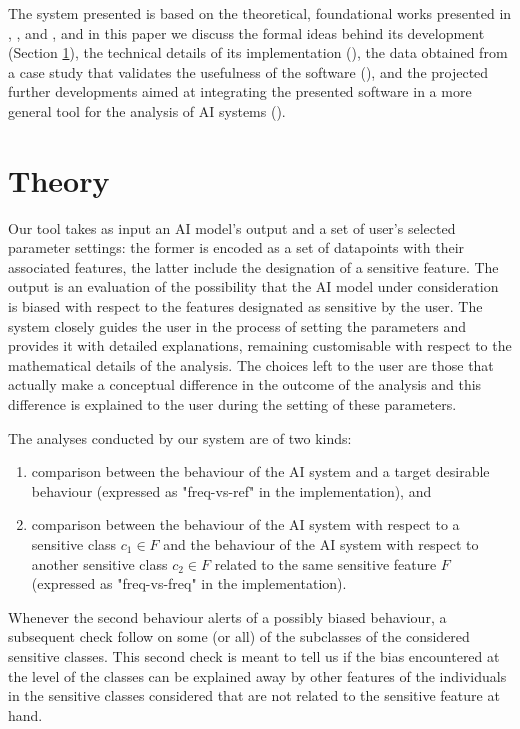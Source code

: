 \documentclass[
]{ceurart}
\begin{document}
The system presented is based on the theoretical, foundational works presented in \cite{dap21}, \cite{dagp22}, and \cite{gp23}, and in this paper we discuss the formal ideas behind its development (Section \ref{sec:theory}), the technical details of its implementation  (), the data obtained from a case study that validates the usefulness of the software (), and the projected further developments aimed at integrating the presented software in a more general tool for the analysis of AI systems ().

\section{Theory}\label{sec:theory}

Our tool takes as input an AI model's output and a set of user's selected parameter settings: the former is encoded as a set of datapoints with their associated features, the latter include the designation of a sensitive feature. The output is an evaluation of the possibility that the AI model under consideration is biased with respect to the features designated as sensitive by the user. The system closely guides the user in the process of setting the parameters and provides it with detailed explanations, remaining customisable with respect to the mathematical details of the analysis. The choices left to the user are those that actually make a conceptual difference in the outcome of the analysis and this difference is explained to the user during the setting of these parameters.

The analyses conducted by our system are of two kinds: 

\begin{enumerate}
	\item comparison between the behaviour of the AI system and a target desirable behaviour (expressed as "freq-vs-ref" in the implementation), and
	
	\item comparison between the behaviour of the AI system with respect to a sensitive class $c_1\in F$ and the behaviour of the AI system with respect to another sensitive class $c_2\in F$ related to the same sensitive feature $F$ (expressed as "freq-vs-freq" in the implementation).
\end{enumerate}

Whenever the second behaviour alerts of a possibly biased behaviour, a subsequent check follow on some (or all) of the subclasses of the considered sensitive classes. This second check is meant to tell us if the bias encountered at the level of the classes can be explained away by other features of the individuals in the sensitive classes considered that are not related to the sensitive feature at hand.
\end{document}
